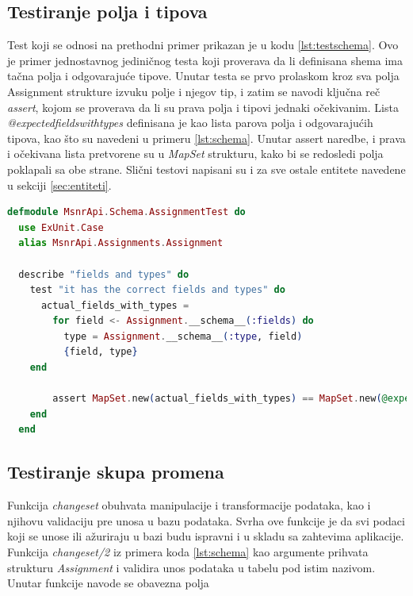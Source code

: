 \documentclass[12pt,oneside]{memoir}
\begin{document}
\subsection{Testiranje polja i tipova}
\par Test koji se odnosi na prethodni primer prikazan je u kodu \ref{lst:testschema}. Ovo je primer jednostavnog jediničnog testa koji proverava da li definisana shema ima tačna polja i odgovarajuće tipove. Unutar testa se prvo prolaskom kroz sva polja Assignment strukture izvuku polje i njegov tip, i zatim se navodi ključna reč \emph{assert}, kojom se proverava da li su prava polja i tipovi jednaki očekivanim. Lista \emph{@expected{\textunderscore}fields{\textunderscore}with{\textunderscore}types} definisana je kao lista parova polja i odgovarajućih tipova, kao što su navedeni u primeru \ref{lst:schema}. Unutar assert naredbe, i prava i očekivana lista pretvorene su u \emph{MapSet} strukturu, kako bi se redosledi polja poklapali sa obe strane. Slični testovi napisani su i za sve ostale entitete navedene u sekciji \ref{sec:entiteti}.

\begin{lstlisting}[language=elixir, caption={Test za proveru polja i tipova tabele assignments},captionpos=b, label={lst:testschema}]
defmodule MsnrApi.Schema.AssignmentTest do
  use ExUnit.Case
  alias MsnrApi.Assignments.Assignment
  
  describe "fields and types" do
    test "it has the correct fields and types" do
      actual_fields_with_types =
        for field <- Assignment.__schema__(:fields) do
          type = Assignment.__schema__(:type, field)
          {field, type}
    end
    
        assert MapSet.new(actual_fields_with_types) == MapSet.new(@expected_fields_with_types)
    end
  end
\end{lstlisting}


\subsection{Testiranje skupa promena}
\par Funkcija \emph{changeset} obuhvata manipulacije i transformacije podataka, kao i njihovu validaciju pre unosa u bazu podataka. Svrha ove funkcije je da svi podaci koji se unose ili ažuriraju u bazi budu ispravni i u skladu sa zahtevima aplikacije. Funkcija \emph{changeset/2} iz primera koda \ref{lst:schema} kao argumente prihvata strukturu \emph{Assignment} i validira unos podataka u tabelu pod istim nazivom. Unutar funkcije navode se obavezna polja  
\end{document}
